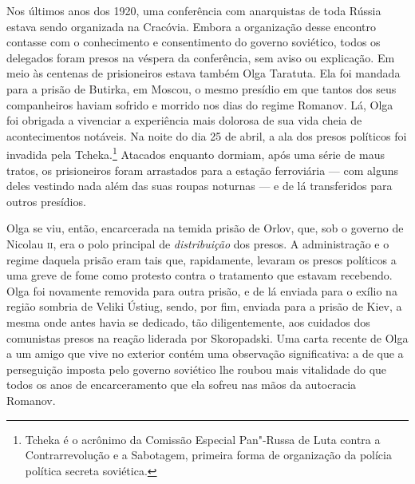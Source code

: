 Nos últimos anos dos 1920, uma conferência com anarquistas de toda
Rússia estava sendo organizada na Cracóvia. Embora
a organização desse encontro contasse com o conhecimento e consentimento do
governo soviético, todos os delegados foram presos na véspera da
conferência, sem aviso ou explicação. Em meio às centenas de
prisioneiros estava também Olga Taratuta. Ela foi mandada para a prisão
de Butirka, em Moscou, o mesmo presídio em que tantos dos seus
companheiros haviam sofrido e morrido nos dias do regime Romanov. Lá,
Olga foi obrigada a vivenciar a experiência mais dolorosa de sua vida
cheia de acontecimentos notáveis. Na noite do dia 25 de abril, a ala dos
presos políticos foi invadida pela Tcheka.\footnote{Tcheka é o acrônimo
  da Comissão Especial Pan"-Russa de Luta contra a Contrarrevolução e a
  Sabotagem, primeira forma de organização da polícia política secreta
  soviética.} Atacados enquanto dormiam, após
uma série de maus tratos, os prisioneiros foram arrastados para a estação ferroviária --- com alguns deles vestindo nada além das suas roupas noturnas --- e de lá
transferidos para outros presídios.

Olga se viu, então, encarcerada na temida prisão de Orlov, que, sob o
governo de Nicolau \textsc{ii}, era o polo principal de \textit{distribuição} dos
presos. A administração e o regime daquela prisão eram tais que,
rapidamente, levaram os presos políticos a uma greve de fome como
protesto contra o tratamento que estavam recebendo. Olga foi novamente
removida para outra prisão, e de lá enviada para o exílio na região
sombria de Veliki Ústiug, sendo, por fim, enviada para a prisão de Kiev,
a mesma onde antes havia se dedicado, tão diligentemente, aos
cuidados dos comunistas presos na reação liderada por Skoropadski. Uma
carta recente de Olga a um amigo que vive no exterior contém uma
observação significativa: a de que a perseguição imposta pelo governo
soviético lhe roubou mais vitalidade do que todos os anos de
encarceramento que ela sofreu nas mãos da autocracia Romanov.

